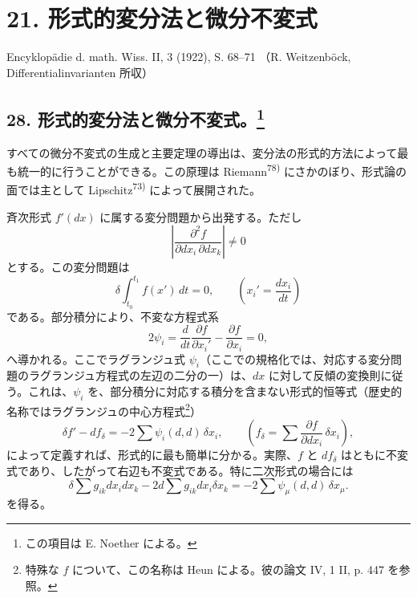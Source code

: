 \documentclass[11pt]{article}
\begin{document}
\section*{21. 形式的変分法と微分不変式}
\begin{center}
Encyklopädie d. math. Wiss. II, 3 (1922), S. 68--71
（R. Weitzenböck, Differentialinvarianten 所収）
\end{center}

\begingroup
\renewcommand{\thefootnote}{\arabic{footnote})}
\setcounter{footnote}{148}
\subsection*{28. 形式的変分法と微分不変式。\footnote{この項目は E. Noether による。}}

すべての微分不変式の生成と主要定理の導出は、変分法の形式的方法によって最も統一的に行うことができる。この原理は Riemann\textsuperscript{78)} にさかのぼり、形式論の面では主として Lipschitz\textsuperscript{73)} によって展開された。

斉次形式 $f'(dx)$ に属する変分問題から出発する。ただし
\[
\left|\frac{\partial^2 f}{\partial dx_i\,\partial dx_k}\right|\ne0
\]
とする。この変分問題は
\begin{equation}
\delta\int_{t_0}^{t_1} f(x')\,dt=0,
\qquad \left(x_i'=\frac{dx_i}{dt}\right)
\tag{140}
\end{equation}
である。部分積分により、不変な方程式系
\[
2\psi_i=\frac{d}{dt}\frac{\partial f}{\partial x_i'}-\frac{\partial f}{\partial x_i}=0,
\]
へ導かれる。ここでラグランジ\nolinebreak[4]ュ式 $\psi_i$（ここでの規格化では、対応する変分問題のラグランジ\nolinebreak[4]ュ方程式の左辺の二分の一）は、$dx$ に対して反傾の変換則に従う。これは、$\psi_i$ を、部分積分に対応する積分を含まない形式的恒等式（歴史的名称ではラグランジ\nolinebreak[4]ュの中心方程式\footnote{特殊な $f$ について、この名称は Heun による。彼の論文 IV, 1 II, p. 447 を参照。}）
\[
\delta f'-df_\delta=-2\sum\psi_i(d,d)\,\delta x_i,
\qquad
\left(f_\delta=\sum\frac{\partial f}{\partial dx_i}\,\delta x_i\right),
\]
によって定義すれば、形式的に最も簡単に分かる。実際、$f$ と $df_\delta$ はともに不変式であり、したがって右辺も不変式である。特に二次形式の場合には
\[
\delta\sum g_{ik}dx_i dx_k-2d\sum g_{ik}dx_i\delta x_k
=-2\sum\psi_\mu(d,d)\,\delta x_\mu.
\]
を得る。
\end{document}
